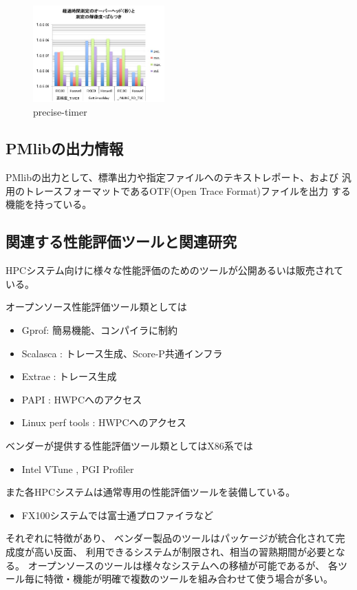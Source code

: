 \documentclass[submit,techrep,noauthor]{ipsj}
\begin{document}
\begin{figure}[tb]
\centering\includegraphics[width=0.45\textwidth]{figs/precise-timer.jpg}
\caption{precise-timer}
\label{fig:precise-timer}
\end{figure}



\subsection{PMlibの出力情報}
PMlibの出力として、標準出力や指定ファイルへのテキストレポート、および
汎用のトレースフォーマットであるOTF(Open Trace Format)ファイルを出力
する機能を持っている。


\subsection{関連する性能評価ツールと関連研究}

HPCシステム向けに様々な性能評価のためのツールが公開あるいは販売されている。\par
オープンソース性能評価ツール類としては
\begin{itemize}
	\item Gprof: 簡易機能、コンパイラに制約
	\item Scalasca \cite{Scalasca:2017} : トレース生成、Score-P共通インフラ
	\item Extrae \cite{Extrae:webpage} : トレース生成
	\item PAPI \cite{PAPI:5.6} : HWPCへのアクセス
	\item Linux perf tools : HWPCへのアクセス
\end{itemize}
ベンダーが提供する性能評価ツール類としてはX86系では 
\begin{itemize}
		\item Intel VTune \cite{Intel:VTune}, PGI Profiler \cite{PGI:Profiler}
\end{itemize}
また各HPCシステムは通常専用の性能評価ツールを装備している。
\begin{itemize}
	\item FX100システムでは富士通プロファイラなど
\end{itemize}
それぞれに特徴があり、
ベンダー製品のツールはパッケージが統合化されて完成度が高い反面、
利用できるシステムが制限され、相当の習熟期間が必要となる。
オープンソースのツールは様々なシステムへの移植が可能であるが、
各ツール毎に特徴・機能が明確で複数のツールを組み合わせて使う場合が多い。
\end{document}
